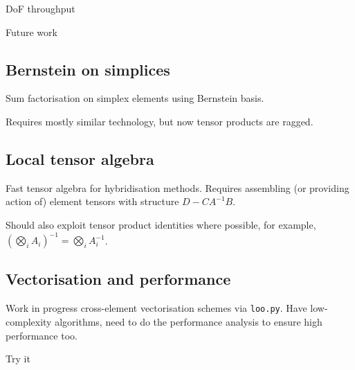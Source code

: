 \documentclass[cmyk,luatex,a0paper,portrait]{baposter}
\newcommand{\fitCurve}[4]{%
  \pgfplotstablegetelem{#2}{C}\of#1
  \pgfmathsetmacro{#3}{\pgfplotsretval}
  \pgfplotstablegetelem{#2}{a}\of#1
  \pgfmathsetmacro{\a}{\pgfplotsretval}
  \pgfplotstablegetelem{#2}{b}\of#1
  \pgfmathsetmacro{\b}{\pgfplotsretval}
  \addplot[densely dashdotted,domain=\a:\b] {#4};
}
\begin{document}
\begin{poster}
\begin{posterbox}[name=curl-curl, column=3, below=flop-scaling,
    span=3, height=0.275]{DoF throughput}
\begin{center}
    \end{center}
  \end{posterbox}

  \begin{posterbox}[name=future, column=0, below=rules,
    span=3, height=0.235]{Future work}
    \raggedright
    \subsection*{Bernstein on simplices}
    \vspace{-0.35\baselineskip}
    Sum factorisation on simplex elements using Bernstein basis.

    Requires mostly similar technology, but now tensor products are
    ragged.
    \vspace{-\baselineskip}
    \subsection*{Local tensor algebra}
    \vspace{-0.35\baselineskip}
    Fast tensor algebra for hybridisation methods.  Requires
    assembling (or providing action of) element tensors with
    structure $D - C A^{-1} B$.

    Should also exploit tensor product identities where possible,
    for example,
    $\left(\bigotimes_i A_i\right)^{-1} = \bigotimes_i A_i^{-1}$.
    \vspace{-\baselineskip}
    \subsection*{Vectorisation and performance}
    \vspace{-0.35\baselineskip}
    Work in progress cross-element vectorisation schemes via
    \texttt{loo.py}.  Have low-complexity algorithms, need to do
    the performance analysis to ensure high performance too.
  \end{posterbox}    
  \begin{posterbox}[name=try, column=3, below=curl-curl,
    span=3, height=0.235]{Try it}
    \raggedright

\end{posterbox}
\end{poster}
\end{document}
